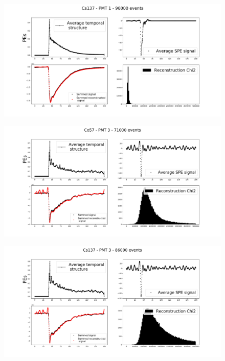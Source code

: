 \documentclass{beamer}
\begin{document}
\begin{frame}
\begin{figure}[h]
\includegraphics[width=1\linewidth]{resultCs1.png}
\end{figure}
\end{frame}

\begin{frame}
\begin{figure}[h]
\includegraphics[width=1\linewidth]{resultCo3.png}
\end{figure}
\end{frame}

\begin{frame}
\begin{figure}[h]
\includegraphics[width=1\linewidth]{resultCs3.png}
\end{figure}
\end{frame}
\end{document}
